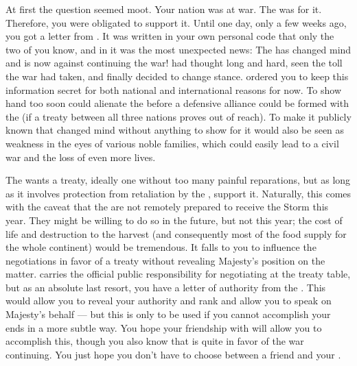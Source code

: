 \documentclass[char]{GL2020}
\begin{document}
At first the question seemed moot. Your nation was at war. The \cQueen{\Monarch} was for it. Therefore, you were obligated to support it. Until one day, only a few weeks ago, you got a letter from \cQueen{\Monarch} \cQueen{} \cQueen{\themself}. It was written in your own personal code that only the two of you know, and in it was the most unexpected news: The \cQueen{\Monarch} has changed \cQueen{\their} mind and is now against continuing the war! \cQueen{\They} had thought long and hard, seen the toll the war had taken, and finally decided to change \cQueen{\their} stance. \cQueen{\They} ordered you to keep this information secret for both national and international reasons for now. To show \cQueen{\their} hand too soon could alienate the \pTech{} before a defensive alliance could be formed with the \pShip{} (if a treaty between all three nations proves out of reach). To make it publicly known that \cQueen{\they} changed \cQueen{\their} mind without anything to show for it would also be seen as weakness in the eyes of various \pFarm{} noble families, which could easily lead to a civil war and the loss of even more lives.

The \cQueen{\Monarch} wants a treaty, ideally one without too many painful reparations, but as long as it involves protection from retaliation by the \pTech{}, \cQueen{\they} support\cQueen{\verbs} it. Naturally, this comes with the caveat that the \pFarm{} are not remotely prepared to receive the Storm this year. They might be willing to do so in the future, but not this year; the cost of life and destruction to the harvest (and consequently most of the food supply for the whole continent) would be tremendous. It falls to you to influence the negotiations in favor of a treaty without revealing \cQueen{\Their} Majesty's position on the matter. \cEvil{\full} carries the official public responsibility for negotiating at the treaty table, but as an absolute last resort, you have a letter of authority from the \cQueen{\Monarch}. This would allow you to reveal your authority and rank and allow you to speak on \cQueen{\their} Majesty's behalf — but this is only to be used if you cannot accomplish your ends in a more subtle way. You hope your friendship with \cEvil{} will allow you to accomplish this, though you also know that \cEvil{} is quite in favor of the war continuing. You just hope you don’t have to choose between a friend and your \cQueen{\monarch}.
\end{document}

